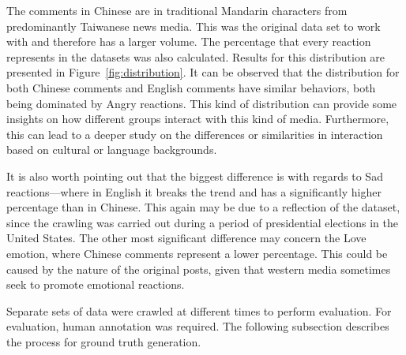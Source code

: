 \documentclass[12pt,a4paper]{report}
\theoremstyle{definition}
\begin{document}
\begin{CJK}{UTF8}{bsmi}
\begin{center}
\begin{figure}[H]
        \end{figure}
        \end{center}
        \par The comments in Chinese are in traditional Mandarin characters from predominantly Taiwanese news media. This was the original data set to work with and therefore has a larger volume. The percentage that every reaction represents in the datasets was also calculated. Results for this distribution are presented in Figure~\ref{fig:distribution}. It can be observed that the distribution for both Chinese comments and English comments have similar behaviors, both being dominated by Angry reactions. This kind of distribution can provide some insights on how different groups interact with this kind of media. Furthermore, this can lead to a deeper study on the differences or similarities in interaction based on cultural or language backgrounds.
        \par It is also worth pointing out that the biggest difference is with regards to Sad reactions—where in English it breaks the trend and has a significantly higher percentage than in Chinese. This again may be due to a reflection of the dataset, since the crawling was carried out during a period of presidential elections in the United States. The other most significant difference may concern the Love emotion, where Chinese comments represent a lower percentage. This could be caused by the nature of the original posts, given that western media sometimes seek to promote emotional reactions.
        \par Separate sets of data were crawled at different times to perform evaluation. For evaluation, human annotation was required. The following subsection describes the process for ground truth generation.

\end{CJK}
\end{document}
